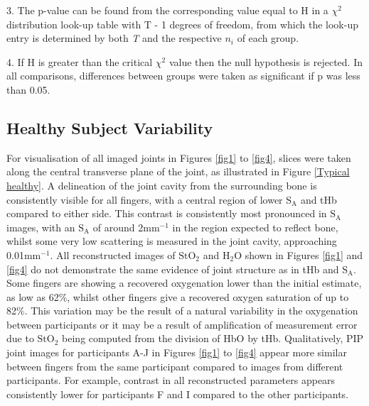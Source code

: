 \documentclass[twoside]{bhamthesis}
\theoremstyle{definition}
\begin{document}
3. The p-value can be found from the corresponding value equal to H in a $\chi^2$ distribution look-up table  with T - 1 degrees of freedom, from which the look-up entry is determined by both \textit{T} and the respective $n_i$ of each group.


4. If H is greater than the critical $\chi^2$ value then the null hypothesis is rejected. In all comparisons, differences between groups were taken as significant if p was less than 0.05. 

\subsection{Healthy Subject Variability}

For visualisation of all imaged joints in Figures \ref{fig1} to \ref{fig4}, slices were taken along the central transverse plane of the joint, as illustrated in Figure \ref{Typical healthy}. A delineation of the joint cavity from the surrounding bone is consistently visible for all fingers, with a central region of lower $\mathrm{S_A}$ and tHb compared to either side. This contrast is consistently most pronounced in $\mathrm{S_A}$ images, with an $\mathrm{S_A}$ of around 2mm$^{-1}$ in the region expected to reflect bone, whilst some very low scattering is measured in the joint cavity, approaching $~$0.01mm$^{-1}$. All reconstructed images of $\mathrm{StO_2}$ and $\mathrm{H_2O}$ shown in Figures \ref{fig1} and \ref{fig4} do not demonstrate the same evidence of joint structure as in tHb and $\mathrm{S_A}$. Some fingers are showing a recovered oxygenation lower than the initial estimate, as low as 62\%, whilst other fingers give a recovered oxygen saturation of up to 82\%. This variation may be the result of a natural variability in the oxygenation between participants or it may be a result of amplification of measurement error due to $\mathrm{StO_2}$ being computed from the division of HbO by tHb. Qualitatively, PIP joint images for participants A-J in Figures \ref{fig1} to \ref{fig4} appear more similar between fingers from the same participant compared to images from different participants. For example, contrast in all reconstructed parameters appears consistently lower for participants F and I compared to the other participants.
\end{document}
